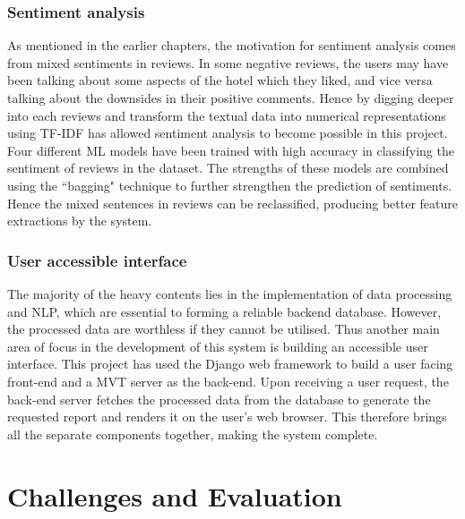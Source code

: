 \documentclass[a4paper]{report}
\begin{document}
{{\subsubsection{Sentiment analysis}
As mentioned in the earlier chapters, the motivation for sentiment analysis comes from mixed sentiments in reviews. In some negative reviews, the users may have been talking about some aspects of the hotel which they liked, and vice versa talking about the downsides in their positive comments. Hence by digging deeper into each reviews and transform the textual data into numerical representations using TF-IDF  has allowed sentiment analysis to become possible in this project. Four different ML models have been trained with high accuracy in classifying the sentiment of reviews in the dataset. The strengths of these models are combined using the “bagging" technique to further strengthen the prediction of sentiments. Hence the mixed sentences in reviews can be reclassified, producing better feature extractions by the system.

\subsubsection{User accessible interface}
The majority of the heavy contents lies in the implementation of data processing and NLP, which are essential to forming a reliable backend database. However, the processed data are worthless if they cannot be utilised. Thus another main area of focus in the development of this system is building an accessible user interface. This project has used the Django web framework to build a user facing front-end and a MVT server as the back-end. Upon receiving a user request, the back-end server fetches the processed data from the database to generate the requested report and renders it on the user's web browser. This therefore brings all the separate components together, making the system complete.

\section{Challenges and Evaluation}
}}
\end{document}
